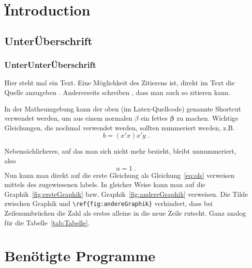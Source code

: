 \documentclass[a4paper,12pt]{article}
\newcommand{\bs}{\boldsymbol}  %
\begin{document}


\setcounter{page}{1}        %


\section{\"Introduction}
\label{Chapter1}

\subsection{Unter\"Uberschrift}

\subsubsection*{UnterUnter\"Uberschrift}



Hier steht mal ein Text. Eine M\"oglichkeit des Zitierens ist, direkt
im Text die Quelle anzugeben \citep[see][pp.225-369]{key1}.
Andererseits schreiben \cite{key2}, dass man auch so zitieren kann.

In der Matheumgebung kann der oben (im Latex-Quellcode) genannte Shortcut verwendet
werden, um aus einem normalen $\beta$ ein fettes $\bs \beta$ zu
machen. Wichtige Gleichungen, die nochmal verwendet werden, sollten nummeriert werden, z.B.
\begin{equation}
\label{eq:ols}
   b = (x'x)x'y \;.
\end{equation}

Nebens\"achlicheres, auf das man sich nicht mehr bezieht, bleibt unnummeriert, also 
\begin{equation*}
   a = 1\;.
\end{equation*}
Nun kann man direkt auf die erste Gleichung als Gleichung~\eqref{eq:ols} verweisen mittels des zugewiesenen labels. In gleicher Weise kann man auf die Graphik~\ref{fig:ersteGraphik} bzw. Graphik~\ref{fig:andereGraphik} verweisen. Die Tilde zwischen \glqq Graphik\grqq{} und \glqq \verb|\ref{fig:andereGraphik}|\grqq{} verhindert, dass bei Zeilenumbr\"uchen die Zahl als erstes alleine in die neue Zeile rutscht. Ganz analog f\"ur die Tabelle~\ref{tab:Tabelle}. 



\section{Ben\"otigte Programme}
\end{document}
